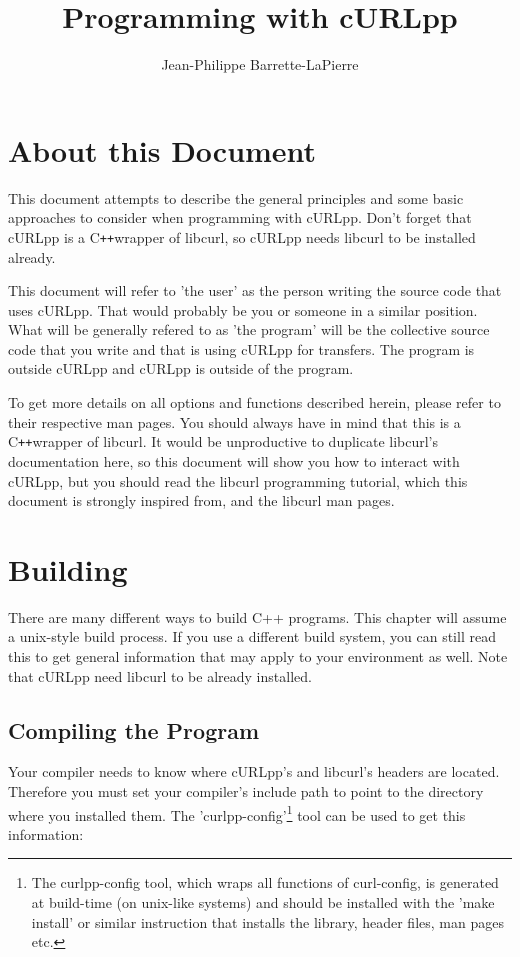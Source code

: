 \documentclass{article}
\author{Jean-Philippe Barrette-LaPierre}
\title{Programming with cURLpp}
\begin{document}
\maketitle
\section{About this Document}
\newcommand{\Cpp}{C{\tt ++}}


This document attempts to describe the general principles and some basic
approaches to consider when programming with cURLpp. Don't forget that cURLpp
is a \Cpp wrapper of libcurl, so cURLpp needs libcurl to be installed already.

This document will refer to 'the user' as the person writing the source code
that uses cURLpp. That would probably be you or someone in a similar position.
What will be generally refered to as 'the program' will be the collective
source code that you write and that is using cURLpp for transfers. The program
is outside cURLpp and cURLpp is outside of the program.

To get more details on all options and functions described herein, please
refer to their respective man pages. You should always have in mind that this
is a \Cpp wrapper of libcurl. It would be unproductive to duplicate libcurl's 
documentation here, so this document will show you how to interact with cURLpp,
but you should read the libcurl programming tutorial, which this document is 
strongly inspired from, and the libcurl man pages.

\section{Building}

There are many different ways to build C++ programs. This chapter will assume a
unix-style build process. If you use a different build system, you can still
read this to get general information that may apply to your environment as
well. Note that cURLpp need libcurl to be already installed.

\subsection{Compiling the Program}

Your compiler needs to know where cURLpp's and libcurl's headers are
located. Therefore you must set your compiler's include path to point to
the directory where you installed them. The 'curlpp-config'\footnote{
The curlpp-config tool, which wraps all functions of curl-config,
is generated at build-time (on unix-like systems) and should be installed 
with the 'make install' or similar instruction that installs the library, 
header files, man pages etc.} tool can be
used to get this information:
\end{document}
